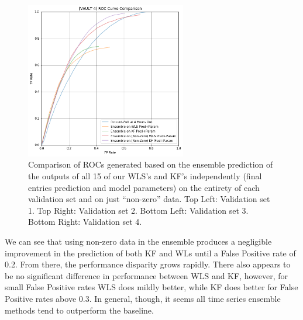 \begin{figure}[h]
\includegraphics[width=7cm]{body/results/Graphs/JustSeries/2.PerformanceofEnsemble/3.Compare/v4.png}
\caption{Comparison of ROCs generated based on the ensemble prediction of the outputs of all 15 of our WLS's and KF's independently (final entries prediction and model parameters) on the entirety of each validation set and on just ``non-zero'' data. Top Left: Validation set 1. Top Right: Validation set 2. Bottom Left: Validation set 3. Bottom Right: Validation set 4.}
\label{fig:ensembleTimeComps}
\end{figure}

We can see that using non-zero data in the ensemble produces a negligible improvement in the prediction of both KF and WLs until a False Positive rate of 0.2. From there, the performance disparity grows rapidly. There also appears to be no significant difference in performance between WLS and KF, however, for small False Positive rates WLS does mildly better, while KF does better for False Positive rates above 0.3. In general, though, it seems all time series ensemble methods tend to outperform the baseline.

\pagebreak

